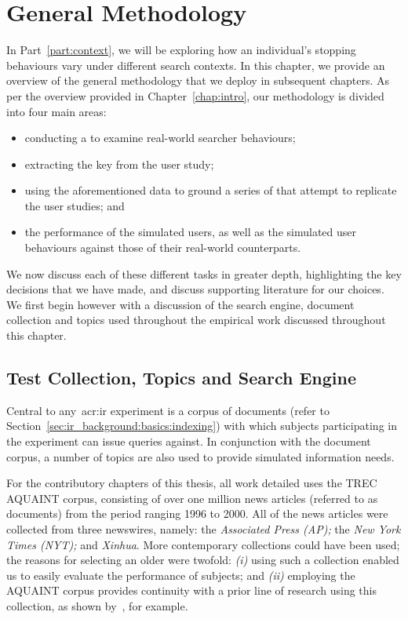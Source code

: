 
\chapter[General Methodology]{General Methodology}\label{chap:method}
In Part~\ref{part:context}, we will be exploring how an individual's stopping behaviours vary under different search contexts. In this chapter, we provide an overview of the general methodology that we deploy in subsequent chapters. As per the overview provided in Chapter~\ref{chap:intro}, our methodology is divided into four main areas:

\begin{itemize}
    \item{conducting a  to examine real-world searcher behaviours;}
    \item{extracting the key  from the user study;}
    \item{using the aforementioned data to ground a series of  that attempt to replicate the user studies; and}
    \item{ the performance of the simulated users, as well as  the simulated user behaviours against those of their real-world counterparts.}
\end{itemize}

We now discuss each of these different tasks in greater depth, highlighting the key decisions that we have made, and discuss supporting literature for our choices. We first begin however with a discussion of the search engine, document collection and topics used throughout the empirical work discussed throughout this chapter.

\section{Test Collection, Topics and Search Engine}\label{sec:csm:methodology:collection}
Central to any~\gls{acr:ir} experiment is a corpus of documents (refer to Section~\ref{sec:ir_background:basics:indexing}) with which subjects participating in the experiment can issue queries against. In conjunction with the document corpus, a number of topics are also used to provide simulated information needs.

For the contributory chapters of this thesis, all work detailed uses the TREC AQUAINT corpus, consisting of over one million news articles (referred to as documents) from the period ranging 1996 to 2000. All of the news articles were collected from three newswires, namely: the \emph{Associated Press (AP);} the \emph{New York Times (NYT);} and \emph{Xinhua}. More contemporary collections could have been used; the reasons for selecting an older were twofold: \emph{(i)} using such a collection enabled us to easily evaluate the performance of subjects; and \emph{(ii)} employing the AQUAINT corpus provides continuity with a prior line of research using this collection, as shown by~\cite{azzopardi2013query_cost}, for example.

